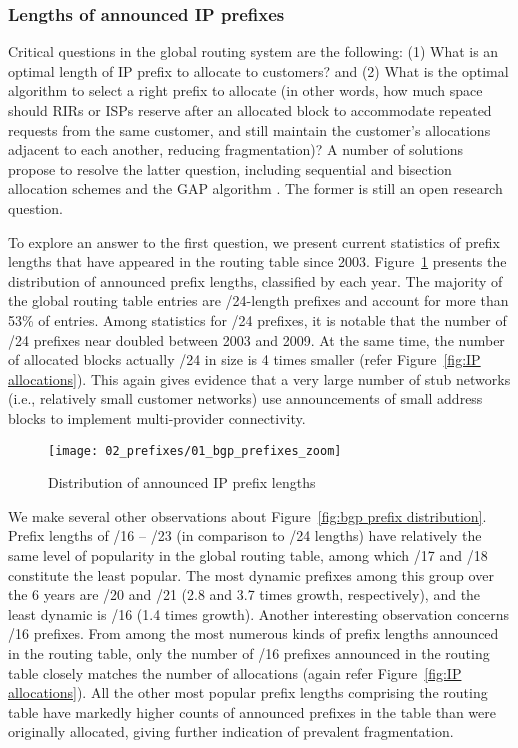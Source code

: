 \subsubsection{Lengths of announced IP prefixes}

Critical questions in the global routing system are the following: (1) What is
an optimal length of IP prefix to allocate to customers? and (2) What is the
optimal algorithm to select a right prefix to allocate (in other words, how
much space should RIRs or ISPs reserve after an allocated block to accommodate
repeated requests from the same customer, and still maintain the customer's
allocations adjacent to each another, reducing fragmentation)? A number of
solutions propose to resolve the latter question, including sequential and
bisection allocation schemes and the GAP algorithm
\cite{Wang:2007:Reduce-IP-Address}. The former is still an open research
question.

To explore an answer to the first question, we present current statistics of
prefix lengths that have appeared in the routing table since 2003.
 Figure~\ref{fig:bgp prefix distribution} presents the distribution of
announced prefix lengths, classified by each year. The majority of the global
routing table entries are /24-length prefixes and account for more than 53\% of
entries. Among statistics for /24 prefixes, it is notable that the number of
/24 prefixes near doubled between 2003 and 2009. At the same time, the number
of allocated blocks actually /24 in size is 4 times smaller (refer
Figure~\ref{fig:IP allocations}). This again gives evidence that a very large
number of stub networks (i.e., relatively small customer networks) use
announcements of small address blocks to implement multi-provider connectivity.

\begin{figure}[htbp]
	\centering
		\texttt{[image: 02\_prefixes/01\_bgp\_prefixes\_zoom]}
	\caption{Distribution of announced IP prefix lengths}
	\label{fig:bgp prefix distribution}
\end{figure}

We make several other observations about Figure~\ref{fig:bgp prefix
distribution}. Prefix lengths of /16 -- /23 (in comparison to /24 lengths) have
relatively the same level of popularity in the global routing table, among
which /17 and /18 constitute the least popular. The most dynamic prefixes among
this group over the 6 years are /20 and /21 (2.8 and 3.7 times growth,
respectively), and the least dynamic is /16 (1.4 times growth). Another
interesting observation concerns /16 prefixes. From among the most numerous
kinds of prefix lengths announced in the routing table, only the number of /16
prefixes announced in the routing table closely matches the number of
allocations (again refer Figure~\ref{fig:IP allocations}).  All the other most
popular prefix lengths comprising the routing table have markedly higher counts
of announced prefixes in the table than were originally allocated, giving
further indication of prevalent fragmentation.

